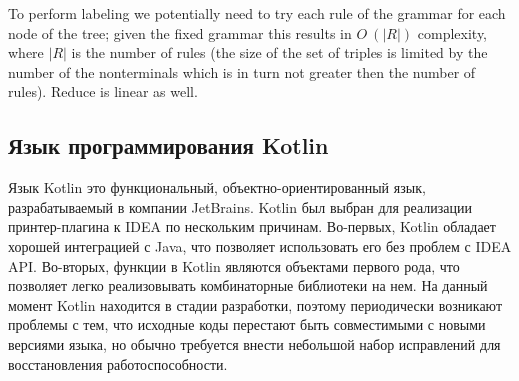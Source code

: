 To perform labeling we potentially need to try each rule of the grammar for each node of the tree; given 
the fixed grammar this results in $O\:(|R|)$ complexity, where $|R|$ is the number of rules  
(the size of the set of triples is limited by the number of the nonterminals which is in turn not 
greater then the number of rules). Reduce is linear as well.

\subsection{Язык программирования Kotlin}

Язык Kotlin это функциональный, объектно-ориентированный язык,
разрабатываемый в компании JetBrains.
Kotlin был выбран для реализации принтер-плагина к IDEA по нескольким причинам. 
Во-первых, Kotlin обладает хорошей интеграцией с Java, что позволяет
использовать его без проблем с IDEA API. 
Во-вторых, функции в Kotlin являются объектами первого рода, что позволяет
легко реализовывать комбинаторные библиотеки на нем.
На данный момент Kotlin находится в стадии разработки, поэтому
периодически возникают
проблемы с тем, что исходные коды перестают быть совместимыми с новыми
версиями языка,
но обычно требуется внести небольшой набор исправлений для
восстановления работоспособности.
